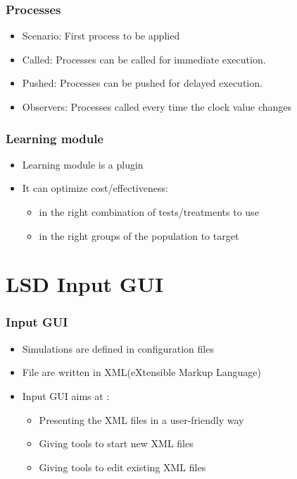 \documentclass[notes, handout]{beamer}
\begin{document}
\begin{frame}
	\frametitle{Processes}
	\begin{itemize}
		\item<1-> Scenario: First process to be applied
		\item<2-> Called: Processes can be called for immediate execution.
		\item<3-> Pushed: Processes can be pushed for delayed execution.
		\item<4-> Observers: Processes called every time the clock value changes
	\end{itemize}
\end{frame}

\begin{frame}
	\frametitle{Learning module}
	\begin{itemize}
		\item Learning module is a plugin
		\item It can optimize cost/effectiveness:
		\begin{itemize}
			\item in the right combination of tests/treatments to use
			\item in the right groups of the population to target
		\end{itemize}
	\end{itemize}
\end{frame}

\section*{LSD Input GUI}
\begin{frame}
	\frametitle{Input GUI}
	\begin{itemize}
		\item Simulations are defined in configuration files
		\item File are written in XML(eXtensible Markup Language)
		\item Input GUI aims at : 
		\begin{itemize}
			\item Presenting the XML files in a user-friendly way
			\item Giving tools to start new XML files
			\item Giving tools to edit existing XML files
		\end{itemize} 
	\end{itemize}
\end{frame}
\end{document}
